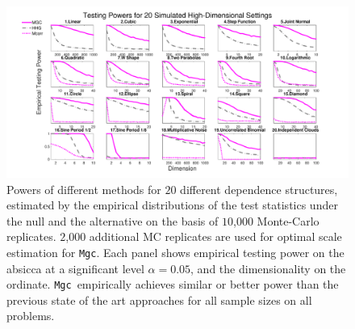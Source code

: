 \documentclass[11pt]{article}
\providecommand{\sct}[1]{{\sc \texttt{#1}}}
\providecommand{\mb}[1]{\boldsymbol{#1}}
\newcommand{\Mgc}{\sct{Mgc}}
\newcommand{\Mgcm}{\sct{Mgc$_M$}}
\newcommand{\Hhg}{\sct{Hhg}}
\newcommand{\Mcorr}{\sct{Mcorr}}
\newcommand{\mbx}{\ensuremath{\mb{x}}}
\newcommand{\mby}{\ensuremath{\mb{y}}}
\begin{document}
\begin{figure}[htbp]
\includegraphics[width=1.0\textwidth]{../Figures/FigHDPower}
\caption{Powers of different methods for $20$ different dependence structures, estimated by the empirical distributions of the test statistics under the null and the alternative on the basis of $10$,$000$ Monte-Carlo replicates. $2$,$000$ additional MC replicates are used for optimal scale estimation for \Mgc.
Each panel shows empirical testing power on the absicca at a significant level $\alpha=0.05$, and the dimensionality on the ordinate.
\Mgc~empirically achieves similar or better power than the previous state of the art approaches for all sample sizes on all problems.
}
\label{f:nD}
\end{figure}




\end{document}
